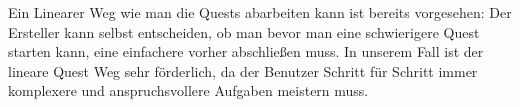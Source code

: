 Ein Linearer Weg wie man die Quests abarbeiten kann ist bereits vorgesehen: Der Ersteller kann selbst entscheiden, ob man bevor man eine schwierigere Quest starten kann, eine einfachere vorher abschließen muss. In unserem Fall ist der lineare Quest Weg sehr förderlich, da der Benutzer Schritt für Schritt immer komplexere und anspruchsvollere Aufgaben meistern muss.